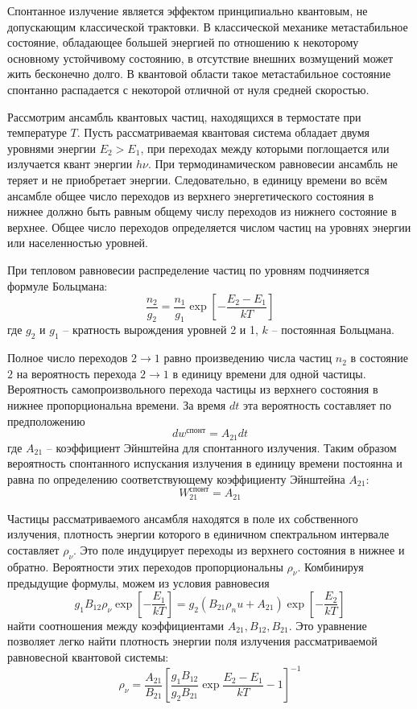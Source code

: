 Спонтанное излучение является эффектом принципиально квантовым, не допускающим 
классической трактовки. В классической механике метастабильное состояние, 
обладающее большей энергией по отношению к некоторому основному устойчивому 
состоянию, в отсутствие внешних возмущений может жить бесконечно долго. В 
квантовой области такое метастабильное состояние спонтанно распадается с 
некоторой отличной от нуля средней скоростью.

Рассмотрим ансамбль квантовых частиц, находящихся в термостате при 
температуре \( T \). Пусть рассматриваемая квантовая система обладает двумя 
уровнями энергии \( E_2 > E_1 \), при переходах между которыми поглощается 
или излучается квант энергии \( h\nu \). При термодинамическом равновесии 
ансамбль не теряет и не приобретает энергии. Следовательно, в единицу времени 
во всём ансамбле общее число переходов из верхнего энергетического состояния 
в нижнее должно быть равным общему числу переходов из нижнего состояние в 
верхнее. Общее число переходов определяется числом частиц на уровнях энергии 
или населенностью уровней. 

При тепловом равновесии распределение частиц по уровням подчиняется формуле 
Больцмана:
\[
	\frac{n_2}{g_2} = \frac{n_1}{g_1}\exp
		\left[ -\frac{E_2 - E_1}{kT}\right]
\]
где \( g_2 \) и \( g_1 \) -- кратность вырождения уровней 2 и 1, 
\( k \) -- постоянная Больцмана.

Полное число переходов \( 2 \rightarrow 1 \) равно произведению числа частиц 
\( n_2 \) в состояние \( 2 \) на вероятность перехода \( 2 \rightarrow 1 \) 
в единицу времени для одной частицы. Вероятность самопроизвольного перехода 
частицы из верхнего состояния в нижнее пропорциональна времени. За время 
\( dt \) эта вероятность составляет по предположению
\[
	dw^\text{спонт} = A_{21} dt
\]
где \( A_{21} \) -- коэффициент Эйнштейна для спонтанного излучения. Таким 
образом вероятность спонтанного испускания излучения в единицу времени 
постоянна и равна по определению соответствующему коэффициенту Эйнштейна 
\( A_{21} \):
\[
	W_{21}^\text{спонт} = A_{21}
\]

Частицы рассматриваемого ансамбля находятся в поле их собственного излучения, 
плотность энергии которого в единичном спектральном интервале составляет 
\( \rho_\nu \). Это поле индуцирует переходы из верхнего состояния в нижнее 
и обратно. Вероятности этих переходов пропорциональны \( \rho_\nu \). 
Комбинируя предыдущие формулы, можем из условия равновесия
\[
	g_1 B_{12} \rho_\nu \exp\left[ -\frac{E_1}{kT} \right] = 
	g_2 \left( B_{21}\rho_nu + A_{21} \right)
		\exp\left[ -\frac{E_2}{kT} \right]
\]
найти соотношения между коэффициентами \( A_{21}, B_{12}, B_{21} \). Это 
уравнение позволяет легко найти плотность энергии поля излучения 
рассматриваемой равновесной квантовой системы:
\[
	\rho_\nu = \frac{A_{21}}{B_{21}}
		\left[ 
			\frac{g_1 B_{12}}{g_2 B_{21}}\exp\frac{E_2 - E_1}{kT} - 1 
		\right]^{-1}
\]

